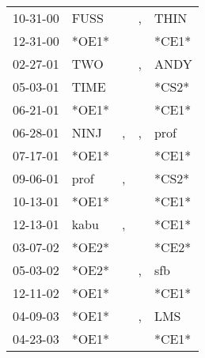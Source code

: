 \begin{supertabular}{p{0.07\textwidth}p{0.06\textwidth}p{0.02\textwidth}p{0.02\textwidth}p{0.06\textwidth}}
 10-31-00\textsuperscript{} &           FUSS\textsuperscript{} &               &             , &           THIN\textsuperscript{} \\
 12-31-00\textsuperscript{} &                            *OE1* &               &               &                            *CE1* \\
 02-27-01\textsuperscript{} &            TWO\textsuperscript{} &               &             , &           ANDY\textsuperscript{} \\
 05-03-01\textsuperscript{} &           TIME\textsuperscript{} &               &               &                            *CS2* \\
 06-21-01\textsuperscript{} &                            *OE1* &               &               &                            *CE1* \\
 06-28-01\textsuperscript{} &           NINJ\textsuperscript{} &             , &             , &           prof\textsuperscript{} \\
 07-17-01\textsuperscript{} &                            *OE1* &               &               &                            *CE1* \\
 09-06-01\textsuperscript{} &           prof\textsuperscript{} &             , &               &                            *CS2* \\
 10-13-01\textsuperscript{} &                            *OE1* &               &               &                            *CE1* \\
 12-13-01\textsuperscript{} &           kabu\textsuperscript{} &             , &               &                            *CE1* \\
 03-07-02\textsuperscript{} &                            *OE2* &               &               &                            *CE2* \\
 05-03-02\textsuperscript{} &                            *OE2* &               &             , &            sfb\textsuperscript{} \\
 12-11-02\textsuperscript{} &                            *OE1* &               &               &                            *CE1* \\
 04-09-03\textsuperscript{} &                            *OE1* &               &             , &            LMS\textsuperscript{} \\
 04-23-03\textsuperscript{} &                            *OE1* &               &               &                            *CE1* \\

\end{supertabular}
